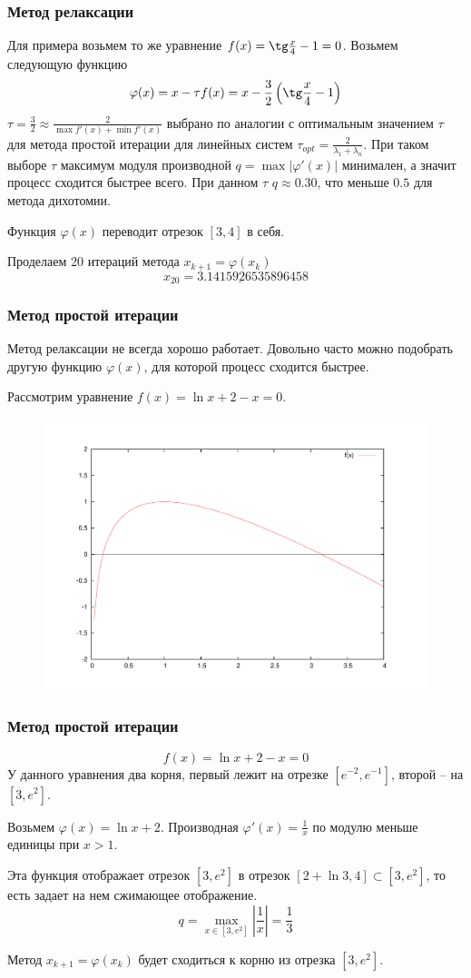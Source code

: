 \documentclass[apectratio=43,unicode]{beamer}
\begin{document}
\begin{frame}
\frametitle{Метод релаксации}
	Для примера возьмем то же уравнение $f(x) = \tg \frac{x}{4} - 1 = 0$. Возьмем следующую функцию
	\[
	\varphi(x) = x - \tau f(x) = x - \frac{3}{2}\left(\tg\frac{x}{4}-1\right)
	\]
	$\tau = \frac{3}{2} \approx \frac{2}{\max f'(x) + \min f'(x)}$ выбрано по аналогии с оптимальным
	значением $\tau$ для метода простой итерации для линейных систем $\tau_{opt} = \frac{2}{\lambda_1 + \lambda_n}$.
	При таком выборе $\tau$ максимум модуля производной $q = \max |\varphi'(x)|$ минимален, а значит процесс сходится быстрее всего.
	При данном $\tau$ $q \approx 0.30$, что меньше $0.5$ для метода дихотомии.

	Функция $\varphi(x)$ переводит отрезок $[3,4]$ в себя.

	Проделаем 20 итераций метода $x_{k+1} = \varphi(x_k)$
	\[x_{20} = \underline{3.141592653589}6458\]
\end{frame}

\begin{frame}
\frametitle{Метод простой итерации}
	Метод релаксации не всегда хорошо работает. Довольно часто можно
	подобрать другую функцию $\varphi(x)$, для которой процесс сходится быстрее.

	Рассмотрим уравнение $f(x) = \ln x + 2 - x = 0$.
	\begin{figure}%
	\includegraphics[height=0.6\textheight]{lnxmxp2.pdf}%
	\end{figure}
\end{frame}

\begin{frame}
\frametitle{Метод простой итерации}
	\[f(x) = \ln x + 2 - x = 0\]
	У данного уравнения два корня, первый лежит на отрезке $[e^{-2},e^{-1}]$, второй -- на $[3,e^2]$.
	\pause

	Возьмем $\varphi(x) = \ln x + 2$. Производная $\varphi'(x) = \frac{1}{x}$ по модулю меньше единицы при $x > 1$.

	Эта функция отображает отрезок $[3, e^2]$ в отрезок $[2 + \ln 3, 4] \subset [3,e^2]$, то есть задает на нем сжимающее отображение.
	\[
	q = \max_{x\in[3,e^2]} \left|\frac{1}{x}\right| = \frac{1}{3}
	\]

	Метод $x_{k+1} = \varphi(x_k)$ будет сходиться к корню из отрезка $[3,e^2]$.
\end{frame}
\end{document}
